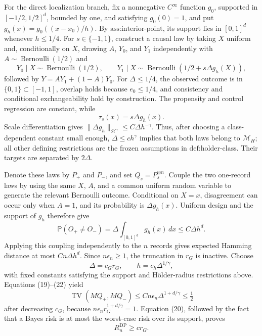 For the direct localization branch, fix a nonnegative \(C^\infty\) function \(g_0\), supported in \([-1/2,1/2]^d\), bounded by one, and satisfying \(g_0(0)=1\), and put \(g_h(x)=g_0((x-x_0)/h)\).  By \(\text{ass:interior-point}\), its support lies in \([0,1]^d\) whenever \(h\le1/4\).  For \(s\in\{-1,1\}\), construct a causal law by taking \(X\) uniform and, conditionally on \(X\), drawing \(A\), \(Y_0\), and \(Y_1\) independently with \(A\sim\operatorname{Bernoulli}(1/2)\) and
\[
 Y_0\mid X\sim\operatorname{Bernoulli}(1/2),
 \qquad
 Y_1\mid X\sim\operatorname{Bernoulli}(1/2+s\Delta g_h(X)),
\]
followed by \(Y=AY_1+(1-A)Y_0\).  For \(\Delta\le1/4\), the observed outcome is in \(\{0,1\}\subset[-1,1]\), overlap holds because \(e_0\le1/4\), and consistency and conditional exchangeability hold by construction.  The propensity and control regression are constant, while
\[
 \tau_s(x)=s\Delta g_h(x).
\]
Scale differentiation gives \(\|\Delta g_h\|_{\mathcal H^\gamma}\le C\Delta h^{-\gamma}\).  Thus, after choosing a class-dependent constant small enough, \(\Delta\le c h^\gamma\) implies that both laws belong to \(\mathcal M_H\); all other defining restrictions are the frozen assumptions in \(\text{def:holder-class}\).  Their targets are separated by \(2\Delta\).

Denote these laws by \(P_+\) and \(P_-\), and set \(Q_s=P_s^{\otimes n}\).  Couple the two one-record laws by using the same \(X\), \(A\), and a common uniform random variable to generate the relevant Bernoulli outcome.  Conditional on \(X=x\), disagreement can occur only when \(A=1\), and its probability is \(\Delta g_h(x)\).  Uniform design and the support of \(g_h\) therefore give
\[
 \mathbb P(O_+\ne O_-)
 =\Delta\int_{[0,1]^d}g_h(x)\,dx
 \le C\Delta h^d.                                                               \tag{21}
\]
Applying this coupling independently to the \(n\) records gives expected Hamming distance at most \(Cn\Delta h^d\).  Since \(n\epsilon_n\ge1\), the truncation in \(r_G\) is inactive.  Choose
\[
 \Delta=c_G r_G,
 \qquad h=c_h\Delta^{1/\gamma},                                                  \tag{22}
\]
with fixed constants satisfying the support and Hölder-radius restrictions above.  Equations (19)--(22) yield
\[
 \operatorname{TV}(MQ_+,MQ_-)
 \le Cn\epsilon_n\Delta^{1+d/\gamma}\le\tfrac12
\]
after decreasing \(c_G\), because \(n\epsilon_n r_G^{1+d/\gamma}=1\).  Equation (20), followed by the fact that a Bayes risk is at most the worst-case risk over its support, proves
\[
 R_n^{\mathrm{DP}}\ge c r_G.                                                     \tag{23}
\]


